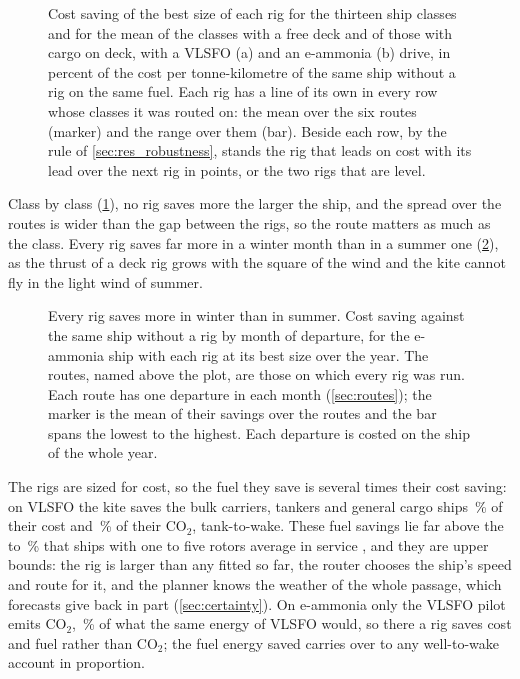 \begin{figure}[tbp]
\centering
{}
\caption{Cost saving of the best size of each rig for the thirteen ship classes and for the mean of the classes with a free deck and of those with cargo on deck, with a VLSFO (a) and an e-ammonia (b) drive, in percent of the cost per tonne-kilometre of the same ship without a rig on the same fuel. Each rig has a line of its own in every row whose classes it was routed on: the mean over the six routes (marker) and the range over them (bar). Beside each row, by the rule of \cref{sec:res_robustness}, stands the rig that leads on cost with its lead over the next rig in points, or the two rigs that are level.}
\label{fig:class_comparison}
\end{figure}

Class by class (\cref{fig:class_comparison}), no rig saves more the larger the ship, and the spread over the routes is wider than the gap between the rigs, so the route matters as much as the class.  Every rig saves far more in a winter month than in a summer one (\cref{fig:season}), as the thrust of a deck rig grows with the square of the wind and the kite cannot fly in the light wind of summer.

\begin{figure}[tbp]
\centering
{}
\caption{ Every rig saves more in winter than in summer. Cost saving against the same ship without a rig by month of departure, for the  e-ammonia ship with each rig at its best size over the year. The routes, named above the plot, are those on which every rig was run. Each route has one departure in each month (\cref{sec:routes}); the marker is the mean of their savings over the routes and the bar spans the lowest to the highest. Each departure is costed on the ship of the whole year.}
\label{fig:season}
\end{figure}

The rigs are sized for cost, so the fuel they save is several times their cost saving: on VLSFO the kite saves the bulk carriers, tankers and general cargo ships \NumSavingOilBulkKite\,\% of their cost and \NumCarbonBulkKite\,\% of their CO$_2$, tank-to-wake. These fuel savings lie far above the  to \,\% that ships with one to five rotors average in service \citep{emsa2023}, and they are upper bounds: the rig is larger than any fitted so far, the router chooses the ship's speed and route for it, and the planner knows the weather of the whole passage, which forecasts give back in part (\cref{sec:certainty}). On e-ammonia only the VLSFO pilot emits CO$_2$, \,\% of what the same energy of VLSFO would, so there a rig saves cost and fuel rather than CO$_2$; the fuel energy saved carries over to any well-to-wake account in proportion.

